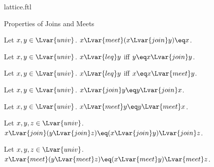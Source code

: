 \documentclass{naproche-library}
\begin{document}
\begin{smodule}[title=Lattices]{lattice.ftl}
\begin{sfragment}{Properties of Joins and Meets}
  \begin{proposition}[forthel,id=MeetAbsorbsJoinThm]
    Let $x,y\in\Lvar{univ}$.
    $x{\Lvar{meet}}(x{\Lvar{join}}y)\eq x$.
  \end{proposition}

  \begin{proposition}[forthel,id=PrecedingIffJoinEqualsLargerOperandThm]
    Let $x,y\in\Lvar{univ}$.
    $x{\Lvar{leq}}y$ iff $y\eq x{\Lvar{join}}y$.
  \end{proposition}

  \begin{proposition}[forthel,id=PrecedingIffMeetEqualsLargerOperandThm]
    Let $x,y\in\Lvar{univ}$.
    $x{\Lvar{leq}}y$ iff $x\eq x{\Lvar{meet}}y$.
  \end{proposition}

  \begin{proposition}[forthel,id=JoinIsCommutativeThm]
    Let $x,y\in\Lvar{univ}$.
    $x{\Lvar{join}}y\eq y{\Lvar{join}}x$.
  \end{proposition}

  \begin{proposition}[forthel,id=MeetIsCommutativeThm]
    Let $x,y\in\Lvar{univ}$.
    $x{\Lvar{meet}}y\eq y{\Lvar{meet}}x$.
  \end{proposition}

  \begin{proposition}[forthel,id=JoinIsAssociativeThm]
    Let $x,y,z\in\Lvar{univ}$.
    $x{\Lvar{join}}(y{\Lvar{join}}z)\eq (x{\Lvar{join}}y){\Lvar{join}}z$.
  \end{proposition}

  \begin{proposition}[forthel,id=MeetIsAssociativeThm]
    Let $x,y,z\in\Lvar{univ}$.
    $x{\Lvar{meet}}(y{\Lvar{meet}}z)\eq (x{\Lvar{meet}}y){\Lvar{meet}}z$.
  \end{proposition}
\end{sfragment}
\end{smodule}
\end{document}
